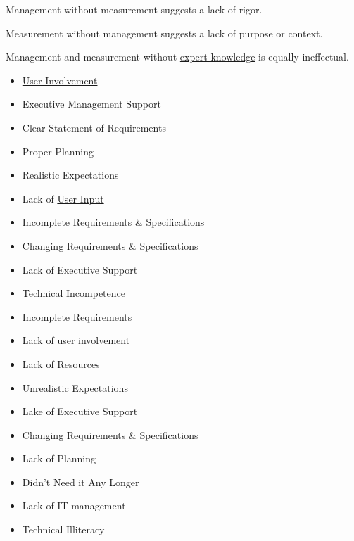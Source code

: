 \documentclass[landscape,30pt]{foils}
\begin{document}

Management without measurement suggests a lack of rigor.

Measurement without management suggests a lack of purpose or context.

Management and measurement without \underline{expert knowledge} is equally ineffectual.



\begin{itemize}
\item \underline{User Involvement}
\item Executive Management Support
\item Clear Statement of Requirements
\item Proper Planning
\item Realistic Expectations
\end{itemize}


\begin{itemize}
\item Lack of \underline{User Input}
\item Incomplete Requirements \& Specifications
\item Changing Requirements \& Specifications
\item Lack of Executive Support
\item Technical Incompetence
\end{itemize}


\begin{itemize}
\item Incomplete Requirements
\item Lack of \underline{user involvement}
\item Lack of Resources
\item Unrealistic Expectations
\item Lake of Executive Support
\item Changing Requirements \& Specifications
\item  Lack of Planning
\item  Didn't Need it Any Longer
\item Lack of IT management
\item Technical Illiteracy  
\end{itemize}
\end{document}
